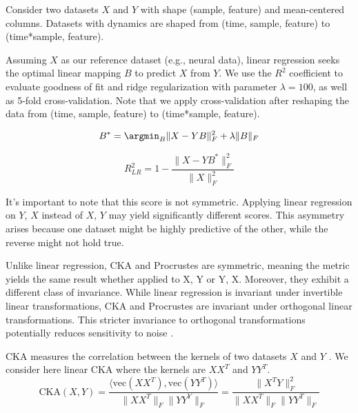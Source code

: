 \documentclass{article} %
\begin{document}
Consider two datasets $X$ and $Y$ with shape (sample, feature) and mean-centered columns. Datasets with dynamics are shaped from (time, sample, feature) to (time*sample, feature).

Assuming $X$ as our reference dataset (e.g., neural data), linear regression seeks the optimal linear mapping $B$ to predict $X$ from $Y$. We use the $R^2$ coefficient to evaluate goodness of fit and ridge regularization with parameter $\lambda = 100$, as well as 5-fold cross-validation. Note that we apply cross-validation after reshaping the data from (time, sample, feature) to (time*sample, feature).

$$B^* = \argmin_B \| X - YB\|^2_F + \lambda \| B \|_F$$

$$R^2_{LR} = 1 - \dfrac{\| X - YB^*\|^2_F}{\| X \|^2_F}$$

It's important to note that this score is not symmetric. Applying linear regression on $Y$, $X$ instead of $X$, $Y$ may yield significantly different scores. This asymmetry arises because one dataset might be highly predictive of the other, while the reverse might not hold true.


Unlike linear regression, CKA and Procrustes are symmetric, meaning the metric yields the same result whether applied to X, Y or Y, X. 
Moreover, they exhibit a different class of invariance.
While linear regression is invariant under invertible linear transformations, CKA and Procrustes are invariant under orthogonal linear transformations. This stricter invariance to orthogonal transformations potentially reduces sensitivity to noise \citep{Kornblith2019}.

CKA measures the correlation between the kernels of two datasets $X$ and $Y$ \citep{Kornblith2019}. We consider here linear CKA where the kernels are $XX^T$ and $YY^T$.
$$\text{CKA}(X, Y) = \dfrac{\langle \text{vec}(XX^T), \text{vec}(YY^T) \rangle}{\|XX^T\|_F \| YY^Y\|_F} = \dfrac{\| X^T Y \|^2_F}{\| X X^T \|_F \| Y Y^T \|_F}$$
\end{document}
